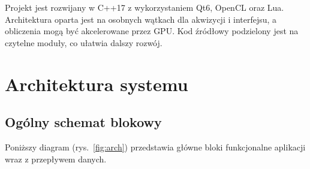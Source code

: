 \documentclass[a4paper,12pt,polish]{article}
\begin{document}
Projekt jest rozwijany w C++17 z wykorzystaniem Qt6, OpenCL oraz Lua. Architektura oparta jest na osobnych wątkach dla akwizycji i interfejsu, a obliczenia mogą być akcelerowane przez GPU. Kod źródłowy podzielony jest na czytelne moduły, co ułatwia dalszy rozwój.

\section{Architektura systemu}
\label{sec:arch}

\subsection{Ogólny schemat blokowy}
Poniższy diagram (rys.~\ref{fig:arch}) przedstawia główne bloki funkcjonalne aplikacji wraz z przepływem danych.
\end{document}
